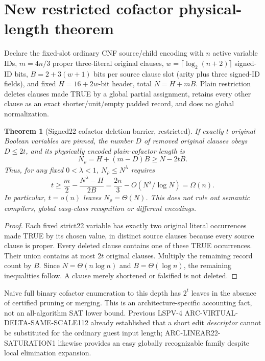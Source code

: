 \documentclass[10pt]{article}
\newtheorem{theorem}{Theorem}
\begin{document}
\section{New restricted cofactor physical-length theorem}
Declare the fixed-slot ordinary CNF source/child encoding with $n$ active variable IDs, $m=4n/3$ proper three-literal original clauses, $w=\lceil\log_2(n+2)\rceil$ signed-ID bits, $B=2+3(w+1)$ bits per source clause slot (arity plus three signed-ID fields), and fixed $H=16+2w$-bit header, total $N=H+mB$. Plain restriction deletes clauses made TRUE by a global partial assignment, retains every other clause as an exact shorter/unit/empty padded record, and does no global normalization.
\begin{theorem}[Signed22 cofactor deletion barrier, restricted]
If exactly $t$ original Boolean variables are pinned, the number $D$ of removed original clauses obeys $D\le2t$, and its physically encoded plain-cofactor length is
\[
N_\rho=H+(m-D)B\ge N-2tB.
\]
Thus, for any fixed $0<\lambda<1$, $N_\rho\le N^\lambda$ requires
\[
t\ge\frac{m}{2}-\frac{N^\lambda-H}{2B}
=\frac{2n}{3}-O(N^\lambda/\log N)=\Omega(n).
\]
In particular, $t=o(n)$ leaves $N_\rho=\Theta(N)$. This does not rule out semantic compilers, global easy-class recognition or different encodings.
\end{theorem}
\begin{proof}Each fixed strict22 variable has exactly two original literal occurrences made TRUE by its chosen value, in distinct source clauses because every source clause is proper. Every deleted clause contains one of these TRUE occurrences. Their union contains at most $2t$ original clauses. Multiply the remaining record count by $B$. Since $N=\Theta(n\log n)$ and $B=\Theta(\log n)$, the remaining inequalities follow. A clause merely shortened or falsified is not deleted.\end{proof}
Naive full binary cofactor enumeration to this depth has $2^t$ leaves in the absence of certified pruning or merging. This is an architecture-specific accounting fact, not an all-algorithm SAT lower bound. Previous LSPV-4 ARC-VIRTUAL-DELTA-SAME-SCALE112 already established that a short edit \emph{descriptor} cannot be substituted for the ordinary guest input length; ARC-LINEAR22-SATURATION1 likewise provides an easy globally recognizable family despite local elimination expansion.
\end{document}
